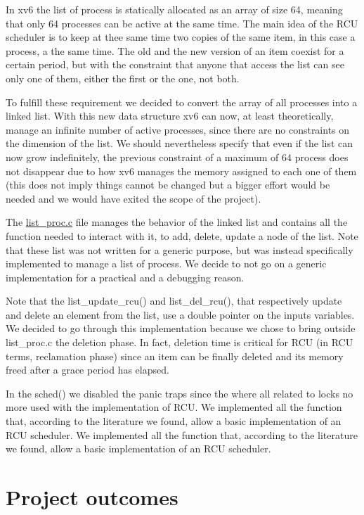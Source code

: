 \documentclass[10pt,a4]{article}
\begin{document}
In xv6 the list of process is statically allocated as an array of size 64, meaning that only 64 processes can be active at the same time. The main idea of the RCU scheduler is to keep at thee same time two copies of the same item, in this case a process, a the same time. The old and the new version of an item coexist for a certain period, but with the constraint that anyone that access the list can see only one of them, either the first or the one, not both. 

To fulfill these requirement we decided to convert the array of all processes into a linked list. With this new data structure xv6 can now, at least theoretically, manage an infinite number of active processes, since there are no constraints on the dimension of the list. We should nevertheless specify that even if the list can now grow indefinitely, the previous constraint of a maximum of 64 process does not disappear due to how xv6 manages the memory  assigned to each one of them (this does not imply things cannot be changed but a bigger effort would be needed and we would have exited the scope of the project).

The \href{[inserire hyperlink al codice]}{list\_proc.c} file manages the behavior of the linked list and contains all the function needed to interact with it, to add, delete, update a node of the list. Note that these list was not written for a  generic purpose, but was instead specifically implemented to manage a list of process. We decide to not go on a generic implementation for a practical and a debugging reason.

Note that the list\_update\_rcu() and list\_del\_rcu(), that respectively update and delete an element from the list, 
use a double pointer on the inputs variables. 
We decided to go through this implementation because we chose to bring outside list\_proc.c the deletion phase. 
In fact, deletion time is critical for RCU (in RCU terms, reclamation phase) since an item can be finally deleted and its memory freed after a grace period has elapsed. 

In the sched() we disabled the panic traps since the where all related to locks no more used with the implementation of RCU. 
We implemented all the function that, according to the literature we found, allow a basic implementation of an RCU scheduler. We implemented all the function that, according to the literature we found, allow a basic implementation of an RCU scheduler.


\section{Project outcomes}
\end{document}
